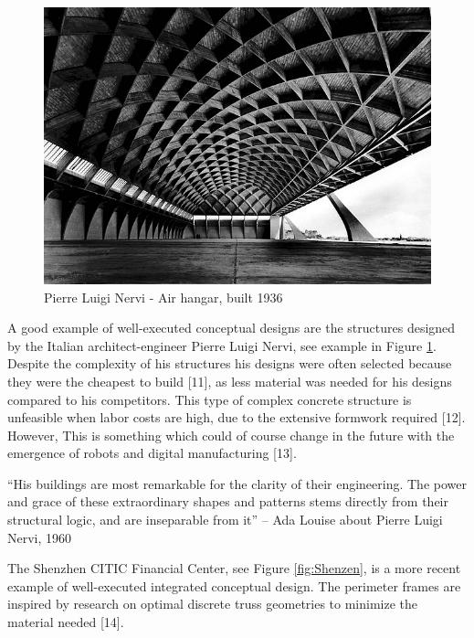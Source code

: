 \begin{figure}
  \includegraphics[width=350pt]{graphics/nervi.jpg}
  \caption{Pierre Luigi Nervi - Air hangar, built 1936}
  \label{fig:nervi}
\end{figure}

A good example of well-executed conceptual designs are the structures designed by the Italian architect-engineer Pierre Luigi Nervi, see example in Figure \ref{fig:nervi}. Despite the complexity of his structures his designs were often selected because they were the cheapest to build [11], as less material was needed for his designs compared to his competitors. This type of complex concrete structure is unfeasible when labor costs are high, due to the extensive formwork required [12]. However, This is something which could of course change in the future with the emergence of robots and digital manufacturing [13].

“His buildings are most remarkable for the clarity of their engineering. The power and grace of these extraordinary shapes and patterns stems directly from their structural logic, and are inseparable from it” – Ada Louise about Pierre Luigi Nervi, 1960 \cite{Mueller2014}

The Shenzhen CITIC Financial Center, see Figure \ref{fig:Shenzen}, is a more recent example of well-executed integrated conceptual design. The perimeter frames are inspired by research on optimal discrete truss geometries to minimize the material needed [14].

